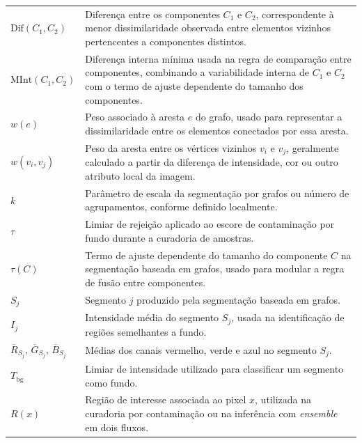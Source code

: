 \begin{longtable}{p{3.0cm}p{12.0cm}}
  $\mathrm{Dif}(C_1,C_2)$ &
  Diferença entre os componentes $C_1$ e $C_2$, correspondente à menor
  dissimilaridade observada entre elementos vizinhos pertencentes a componentes
  distintos.\\

  $\mathrm{MInt}(C_1,C_2)$ &
  Diferença interna mínima usada na regra de comparação entre componentes,
  combinando a variabilidade interna de $C_1$ e $C_2$ com o termo de ajuste
  dependente do tamanho dos componentes.\\
  
  $w(e)$ &
  Peso associado à aresta $e$ do grafo, usado para representar a dissimilaridade
  entre os elementos conectados por essa aresta.\\

  $w(v_i,v_j)$ &
  Peso da aresta entre os vértices vizinhos $v_i$ e $v_j$, geralmente calculado a
  partir da diferença de intensidade, cor ou outro atributo local da imagem.\\

  $k$ &
  Parâmetro de escala da segmentação por grafos ou número de agrupamentos,
  conforme definido localmente.\\

  $\tau$ &
  Limiar de rejeição aplicado ao escore de contaminação por fundo durante a
  curadoria de amostras.\\

  $\tau(C)$ &
  Termo de ajuste dependente do tamanho do componente $C$ na segmentação baseada
  em grafos, usado para modular a regra de fusão entre componentes.\\

  $S_j$ &
  Segmento $j$ produzido pela segmentação baseada em grafos.\\

  $I_j$ &
  Intensidade média do segmento $S_j$, usada na identificação de regiões
  semelhantes a fundo.\\

  $\overline{R}_{S_j}$, $\overline{G}_{S_j}$, $\overline{B}_{S_j}$ &
  Médias dos canais vermelho, verde e azul no segmento $S_j$.\\

  $T_{\mathrm{bg}}$ &
  Limiar de intensidade utilizado para classificar um segmento como fundo.\\

  $R(x)$ &
  Região de interesse associada ao pixel $x$, utilizada na curadoria por
  contaminação ou na inferência com \textit{ensemble} em dois fluxos.\\


\end{longtable}
